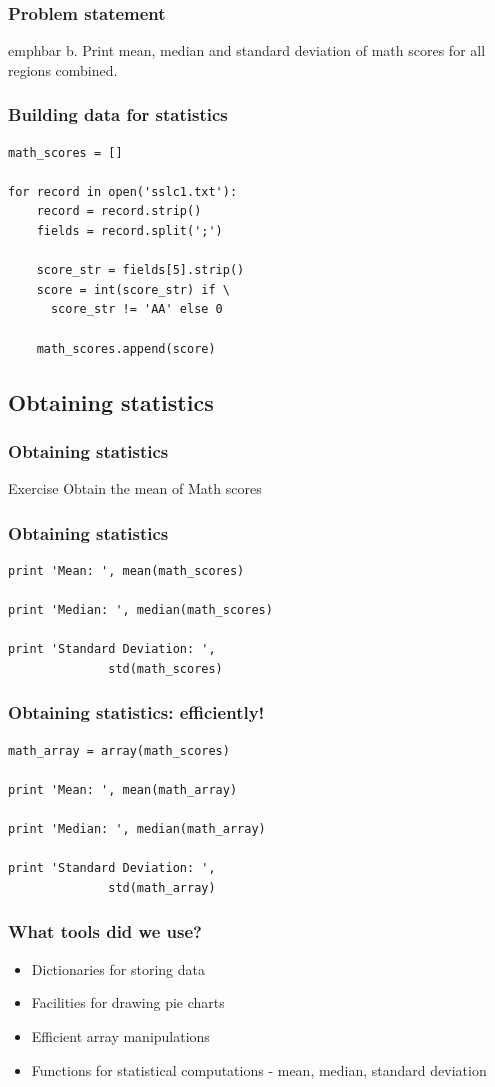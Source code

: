 \documentclass[14pt,compress]{beamer}
\newcommand{\emphbar}[1]
{\begin{beamercolorbox}[rounded=true]{emphbar} 
      {#1}
 \end{beamercolorbox}
}
\newcounter{time}
\newcommand{\inctime}[1]{\addtocounter{time}{#1}{\tiny \thetime\ m}}
\begin{document}
\begin{frame}
  \frametitle{Problem statement}
    \emphbar{b. Print mean, median and standard deviation of math scores for all regions combined.}
\end{frame}

\begin{frame}[fragile]
  \frametitle{Building data for statistics}
  \begin{lstlisting}
math_scores = []

for record in open('sslc1.txt'):
    record = record.strip()
    fields = record.split(';')

    score_str = fields[5].strip()
    score = int(score_str) if \
      score_str != 'AA' else 0

    math_scores.append(score)
  \end{lstlisting}
\end{frame}

\subsection{Obtaining statistics}
\begin{frame}[fragile]
  \frametitle{Obtaining statistics}
  \begin{block}{Exercise}
    Obtain the mean of Math scores
  \end{block}
\end{frame}

\begin{frame}[fragile]
  \frametitle{Obtaining statistics}
  \begin{lstlisting}
print 'Mean: ', mean(math_scores)

print 'Median: ', median(math_scores)

print 'Standard Deviation: ',
              std(math_scores)
  \end{lstlisting}
  \inctime{10}
\end{frame}

\begin{frame}[fragile]
  \frametitle{Obtaining statistics: efficiently!}
  \begin{lstlisting}
math_array = array(math_scores)

print 'Mean: ', mean(math_array)

print 'Median: ', median(math_array)

print 'Standard Deviation: ',
              std(math_array)
  \end{lstlisting}
  \inctime{5}
\end{frame}

\begin{frame}[fragile]
  \frametitle{What tools did we use?}
  \begin{itemize}
   \item Dictionaries for storing data
   \item Facilities for drawing pie charts
   \item Efficient array manipulations
   \item Functions for statistical computations - mean, median, standard deviation
  \end{itemize}
\end{frame}
\end{document}
